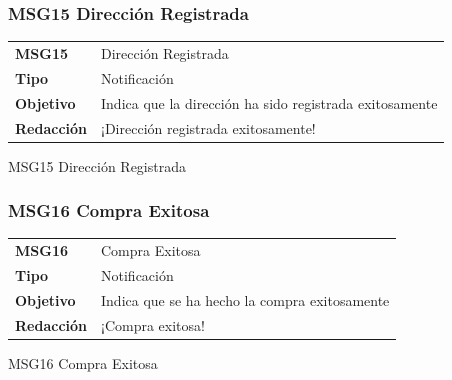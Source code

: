 \documentclass[14pt]{article}
\begin{document}
            \subsubsection{MSG15 Dirección Registrada}\label{MSG15 Dirección Registrada}
                \begin{table}[H]
                    \begin{center}
                        \begin{tabular}{| l | l | } \hline
                        \textbf{MSG15} & Dirección Registrada\\
                        \textbf{Tipo} & Notificación \\
                        \textbf{Objetivo} & Indica que la dirección ha sido registrada exitosamente \\
                        \textbf{Redacción} & ¡Dirección registrada exitosamente! \\ \hline
                        \end{tabular}
                        
                        \vspace{0.3cm} MSG15 Dirección Registrada
                    \end{center}
                \end{table}
                
            \subsubsection{MSG16 Compra Exitosa}\label{MSG16 Compra Exitosa}
                \begin{table}[H]
                    \begin{center}
                        \begin{tabular}{| l | l | } \hline
                        \textbf{MSG16} & Compra Exitosa\\
                        \textbf{Tipo} & Notificación \\
                        \textbf{Objetivo} & Indica que se ha hecho la compra exitosamente \\
                        \textbf{Redacción} & ¡Compra exitosa! \\ \hline
                        \end{tabular}
                        
                        \vspace{0.3cm} MSG16 Compra Exitosa
                    \end{center}
                \end{table}
                
\end{document}
